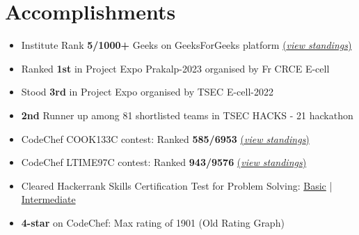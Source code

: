 \documentclass[a4,10pt]{article}
\newenvironment{zitemize}{
\begin{itemize}\itemsep0pt \parskip0pt \parsep1pt}
{\end{itemize}\vspace{-0.5cm}}
\begin{document}
\section{Accomplishments}
\begin{zitemize}
    \item  Institute Rank \textbf{5/1000+} Geeks on GeeksForGeeks platform \href{https://auth.geeksforgeeks.org/college/thadomal-shahani-engineering-college-tsec-mumbai/}{(\textit{view standings})}
    \item Ranked \textbf{1st} in Project Expo Prakalp-2023 organised by Fr CRCE E-cell
    \item Stood \textbf{3rd} in Project Expo organised by TSEC E-cell-2022
    \item \textbf{2nd} Runner up among 81 shortlisted teams in TSEC HACKS - 21 hackathon 
    \item  CodeChef COOK133C contest: Ranked \textbf{585/6953} \href{https://www.codechef.com/rankings/COOK133C?itemsPerPage=100&order=asc&page=70&search=shyren_more&sortBy=rank}{(\textit{view standings})}
    \item  CodeChef LTIME97C contest: Ranked \textbf{943/9576} \href{https://www.codechef.com/rankings/LTIME97C?itemsPerPage=100&order=asc&page=70&search=shyren_more&sortBy=rank}{(\textit{view standings})}
    \item Cleared Hackerrank Skills Certification Test for Problem Solving:         
        \href{https://www.hackerrank.com/certificates/69fa323a6b13}{Basic} |
        \href{https://www.hackerrank.com/certificates/7be43b2d0925}{Intermediate} 
     
    
    \item \textbf{4-star} on CodeChef: Max rating of 1901 (Old Rating Graph)
    
    
    
    
    \end{zitemize}

\end{document}
